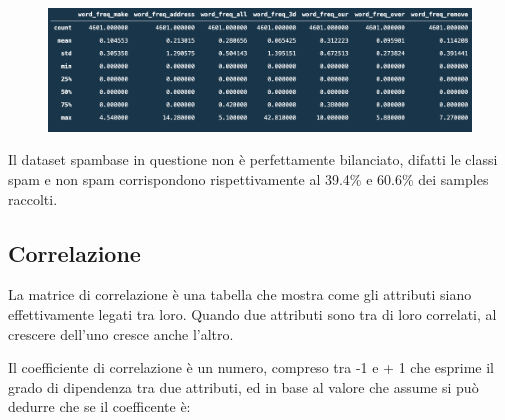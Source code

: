 \documentclass[12pt,a4paper]{article}
\begin{document}
\begin{figure}[h]
    \includegraphics[width=1\columnwidth]{pandas_describe.png}
    \caption{}
\end{figure}

Il dataset spambase in questione non è perfettamente bilanciato, difatti le classi spam e non spam corrispondono rispettivamente al 39.4\% e 60.6\% dei samples raccolti.

\subsection{Correlazione}
La matrice di correlazione è una tabella che mostra come gli attributi  siano effettivamente legati tra loro. Quando due attributi sono tra di loro correlati, al crescere dell’uno cresce anche l’altro.

Il coefficiente di correlazione è un numero, compreso tra -1 e + 1 che esprime il grado di dipendenza tra due attributi, ed in base al valore che assume si può dedurre che se il coefficente è:
\end{document}

